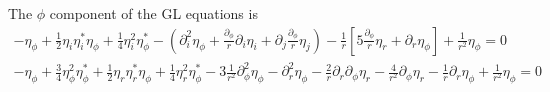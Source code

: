 \documentclass[aps,prl,preprint]{revtex4-2}
\begin{document}
The $\phi$ component of the GL equations is
\begin{align}
    -\eta_\phi+\frac{1}{2}\eta_i\eta_i^*\eta_\phi
    +\frac{1}{4}\eta_i^2\eta_\phi^*
    -\left(\partial_i^2\eta_\phi
    +\frac{\partial_\phi}{r}\partial_i\eta_i
    +\partial_j\frac{\partial_\phi}{r}\eta_j\right)
    -\frac{1}{r}\left[5\frac{\partial_\phi}{r}\eta_r
    +\partial_r\eta_\phi\right]
    +\frac{1}{r^2}\eta_\phi=0\nonumber\\
    -\eta_\phi+\frac{3}{4}\eta_\phi^2\eta_\phi^*
    +\frac{1}{2}\eta_r\eta_r^*\eta_\phi
    +\frac{1}{4}\eta_r^2\eta_\phi^*
    -3\frac{1}{r^2}\partial_\phi^2\eta_\phi
    -\partial_r^2\eta_\phi
    -\frac{2}{r}\partial_r\partial_\phi\eta_r
    -\frac{4}{r^2}\partial_\phi\eta_r
    -\frac{1}{r}\partial_r\eta_\phi
    +\frac{1}{r^2}\eta_\phi=0\nonumber
\end{align}
\end{document}
